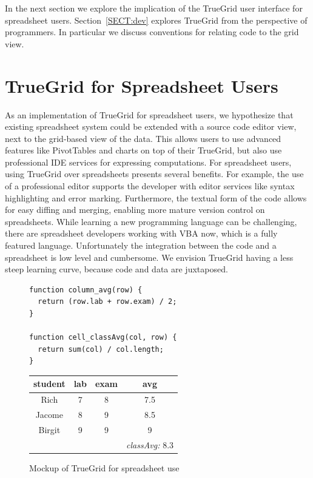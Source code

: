 \documentclass{llncs}
\begin{document}
In the next section we explore the implication of the TrueGrid user interface for spreadsheet users. Section~\ref{SECT:dev} explores TrueGrid from the perspective of programmers. In particular we discuss conventions for relating code to the grid view. 

\section{TrueGrid for Spreadsheet Users}

As an implementation of TrueGrid for spreadsheet users, we hypothesize that existing spreadsheet system could be extended with a source code editor view, next to the grid-based view of the data. This allows users to  use advanced features like PivotTables and charts on top of their TrueGrid, but also use professional IDE services for expressing computations. For spreadsheet users, using TrueGrid over spreadsheets presents several benefits. For example, the use of a professional  editor supports the developer with editor services like syntax highlighting and error marking. Furthermore, the textual form of the code allows for easy diffing and merging, enabling more mature version control on spreadsheets. While learning a new programming language can be challenging, there are spreadsheet developers working with VBA now, which is a fully featured language. Unfortunately the integration between the code and a spreadsheet is low level and cumbersome. We envision TrueGrid having a less steep learning curve, because code and data are juxtaposed.

\begin{figure}[t]
\begin{minipage}{0.6\linewidth}
\begin{lstlisting}
function column_avg(row) {
  return (row.lab + row.exam) / 2;
}

function cell_classAvg(col, row) {   
  return sum(col) / col.length; 
}
\end{lstlisting}
\end{minipage}
\begin{minipage}{0.38\linewidth}
\centering
\sffamily
\begin{tabular}{|c|c|c|c|}\hline
student & lab & exam & avg\\\hline\hline
Rich   & 7 & 8 & 7.5 \\\hline
Jacome & 8 & 9 & 8.5\\\hline
Birgit & 9 & 9 & 9 \\\hline
 & & & \textit{classAvg:} 8.3 \\\hline
\end{tabular}
\end{minipage}
\caption{Mockup of TrueGrid for spreadsheet use}
\label{FIG:grades}
\end{figure}
\end{document}
